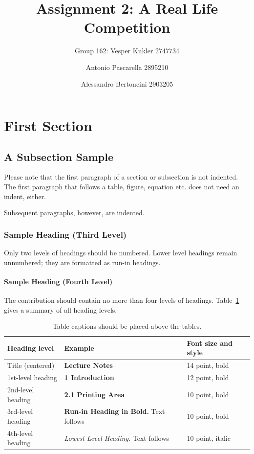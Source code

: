 \documentclass[runningheads]{llncs}
\begin{document}
%
\title{Assignment 2: A Real Life Competition}
%
%
\author{Group 162: Vesper Kukler 2747734 \and
Antonio Pascarella 2895210 \and
Alessandro Bertoncini 2903205}
%
%
%
\maketitle              %
%
%
%
%
\section{First Section}
\subsection{A Subsection Sample}
Please note that the first paragraph of a section or subsection is
not indented. The first paragraph that follows a table, figure,
equation etc. does not need an indent, either.

Subsequent paragraphs, however, are indented.

\subsubsection{Sample Heading (Third Level)} Only two levels of
headings should be numbered. Lower level headings remain unnumbered;
they are formatted as run-in headings.

\paragraph{Sample Heading (Fourth Level)}
The contribution should contain no more than four levels of
headings. Table~\ref{tab1} gives a summary of all heading levels.

\begin{table}
\caption{Table captions should be placed above the
tables.}\label{tab1}
\begin{tabular}{|l|l|l|}
\hline
Heading level &  Example & Font size and style\\
\hline
Title (centered) &  {\Large\bfseries Lecture Notes} & 14 point, bold\\
1st-level heading &  {\large\bfseries 1 Introduction} & 12 point, bold\\
2nd-level heading & {\bfseries 2.1 Printing Area} & 10 point, bold\\
3rd-level heading & {\bfseries Run-in Heading in Bold.} Text follows & 10 point, bold\\
4th-level heading & {\itshape Lowest Level Heading.} Text follows & 10 point, italic\\
\hline
\end{tabular}
\end{table}
\end{document}
